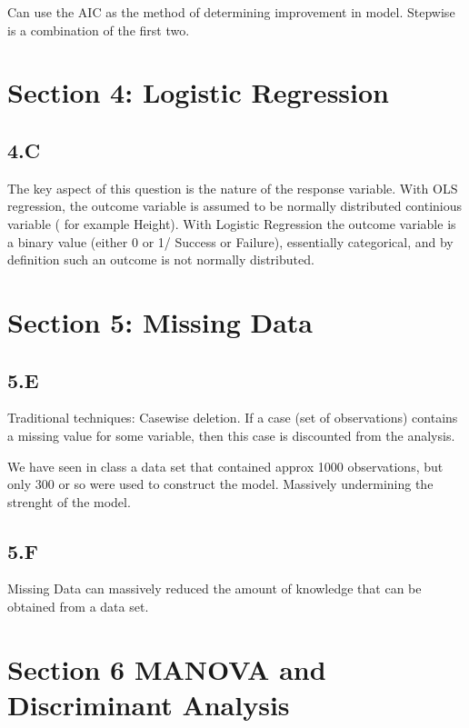 \documentclass[11pt]{article} %
\begin{document}
Can use the AIC as the method of determining improvement in model. Stepwise is a combination of the first two.


\section*{Section 4: Logistic Regression}

\subsection*{4.C}
The key aspect of this question is the nature of the response variable.
With OLS regression, the outcome variable is assumed to be normally distributed continious variable ( for example Height).
With Logistic Regression the outcome variable is a binary value (either 0 or 1/ Success or Failure), essentially categorical, and by definition such an outcome is not normally distributed.




\section*{Section 5: Missing Data}



\subsection*{5.E}
Traditional techniques: Casewise deletion.
If a case (set of observations) contains a missing value for some variable, then this case is discounted from the analysis.

We have seen in class a data set that contained approx 1000 observations, but only 300 or so were used to construct the model. Massively undermining the strenght of the model.


\subsection*{5.F}
Missing Data can massively reduced the amount of knowledge that can be obtained from a data set.

\section*{Section 6 MANOVA and Discriminant Analysis}
\end{document}
